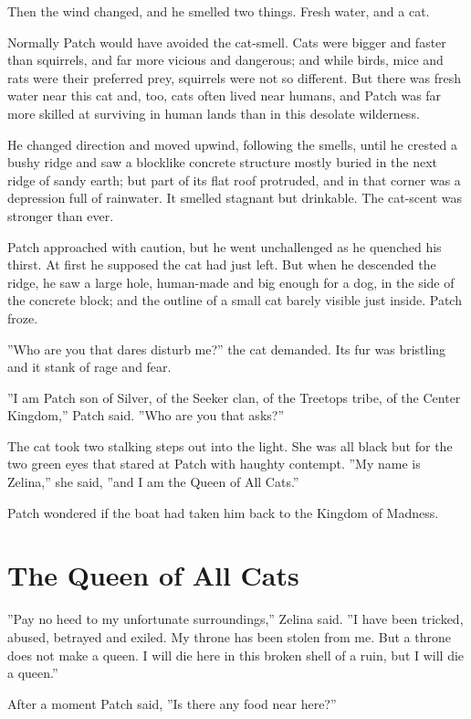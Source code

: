 \documentclass[12pt]{book}
\begin{document}
Then the wind changed, and he smelled two things. Fresh water, and a cat.

Normally Patch would have avoided the cat-smell. Cats were bigger and faster than squirrels, and far more vicious and dangerous; and while birds, mice and rats were their preferred prey, squirrels were not so different. But there was fresh water near this cat %
and, too, cats often lived near humans, and Patch was far more skilled at surviving in human lands than in this desolate wilderness.

He changed direction and moved upwind, following the smells, until he crested a bushy ridge and saw a blocklike concrete structure mostly buried in the next ridge of sandy earth; but part of its flat roof protruded, and in that corner was a depression full of rainwater. It smelled stagnant but drinkable. The cat-scent was stronger than ever.

Patch approached with caution, but he went unchallenged as he quenched his thirst. At first he supposed the cat had just left. But when he descended the ridge, he saw a large hole, human-made and big enough for a dog, in the side of the concrete block; and the outline of a small cat barely visible just inside. Patch froze.

''Who are you that dares disturb me?'' the cat demanded. Its fur was bristling and it stank of rage and fear. 

''I am Patch son of Silver, of the Seeker clan, of the Treetops tribe, of the Center Kingdom,'' Patch said. ''Who are you that asks?''

The cat took two stalking steps out into the light. She was all black but for the two green eyes that stared at Patch with haughty contempt. ''My name is Zelina,'' she said, ''and I am the Queen of All Cats.''

Patch wondered if the boat had taken him back to the Kingdom of Madness.


\section{The Queen of All Cats}

''Pay no heed to my unfortunate surroundings,'' Zelina said. ''I have been tricked, abused, betrayed and exiled. My throne has been stolen from me. But a throne does not make a queen. I will die here in this broken shell of a ruin, but I will die a queen.''

After a moment Patch said, ''Is there any food near here?''
\end{document}
